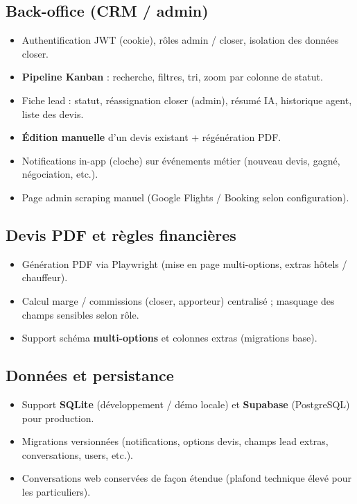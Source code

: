\documentclass[11pt,a4paper]{article}
\begin{document}
\subsection{Back-office (CRM / admin)}
\begin{itemize}[leftmargin=*]
  \item Authentification JWT (cookie), rôles admin / closer, isolation des données closer.
  \item \textbf{Pipeline Kanban} : recherche, filtres, tri, zoom par colonne de statut.
  \item Fiche lead : statut, réassignation closer (admin), résumé IA, historique agent, liste des devis.
  \item \textbf{Édition manuelle} d'un devis existant + régénération PDF.
  \item Notifications in-app (cloche) sur événements métier (nouveau devis, gagné, négociation, etc.).
  \item Page admin scraping manuel (Google Flights / Booking selon configuration).
\end{itemize}

\subsection{Devis PDF et règles financières}
\begin{itemize}[leftmargin=*]
  \item Génération PDF via Playwright (mise en page multi-options, extras hôtels / chauffeur).
  \item Calcul marge / commissions (closer, apporteur) centralisé ; masquage des champs sensibles selon rôle.
  \item Support schéma \textbf{multi-options} et colonnes extras (migrations base).
\end{itemize}

\subsection{Données et persistance}
\begin{itemize}[leftmargin=*]
  \item Support \textbf{SQLite} (développement / démo locale) et \textbf{Supabase} (PostgreSQL) pour production.
  \item Migrations versionnées (notifications, options devis, champs lead extras, conversations, users, etc.).
  \item Conversations web conservées de façon étendue (plafond technique élevé pour les particuliers).
\end{itemize}
\end{document}
